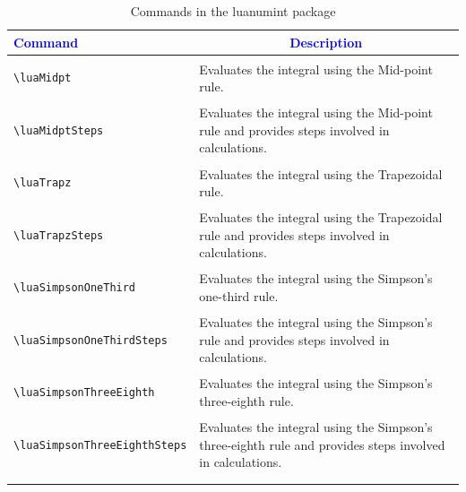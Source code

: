 \documentclass{article}
\begin{document}
\begin{center}
\begin{longtable}{lm{10cm}}
\toprule
\multicolumn{1}{l}{\textcolor{blue}{Command}} & \multicolumn{1}{c}{\textcolor{blue}{Description}}  \\
\toprule
\begin{lstlisting}[caption={[]}]
\luaMidpt
\end{lstlisting}
 & Evaluates the integral using the Mid-point rule. \\
\midrule
\begin{lstlisting}[caption={[]}]
\luaMidptSteps
\end{lstlisting}
 &   Evaluates the integral using the Mid-point rule and provides steps involved in calculations. \\
\midrule
\begin{lstlisting}[caption={[]}]
\luaTrapz
\end{lstlisting}
 & Evaluates the integral using the Trapezoidal rule. \\
\midrule
\begin{lstlisting}[caption={[]}]
\luaTrapzSteps
\end{lstlisting}
 &   Evaluates the integral using the Trapezoidal rule and provides steps involved in calculations. \\
\midrule 
\begin{lstlisting}[caption={[]}]
\luaSimpsonOneThird
\end{lstlisting}
 & Evaluates the integral using the Simpson's one-third rule. \\
\midrule
\begin{lstlisting}[caption={[]}]
\luaSimpsonOneThirdSteps
\end{lstlisting}
 &   Evaluates the integral using the Simpson's rule and provides steps involved in calculations. \\
\midrule
\begin{lstlisting}[caption={[]}]
\luaSimpsonThreeEighth
\end{lstlisting}
 & Evaluates the integral using the Simpson's three-eighth rule. \\
\midrule
\begin{lstlisting}[caption={[]}]
\luaSimpsonThreeEighthSteps
\end{lstlisting}
 &   Evaluates the integral using  the Simpson's three-eighth rule and provides steps involved in calculations. \\
\bottomrule \\
\caption{Commands in the luanumint package}
\label{tbl:cmdluanum}
\end{longtable}
\end{center}
\end{document}

